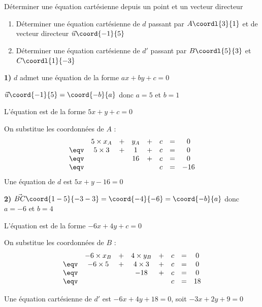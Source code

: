 \begin{methode}{Déterminer une équation cartésienne depuis un point et un vecteur directeur}
	\begin{enumerate}
		\item Déterminer une équation cartésienne de $d$ passant par $A\coordl{3}{1}$ et de vecteur directeur $\vec{u}\coord{-1}{5}$
		\item Déterminer une équation cartésienne de $d'$ passant par $B\coordl{5}{3}$ et $C\coordl{1}{-3}$
	\end{enumerate}

	\begin{correction}

		\textbf{1)} $d$ admet une équation de la forme $ax + by + c = 0$

		$\vec{u}\coord{-1}{5} = \coord{-b}{a}$ donc $a = 5$ et $b = 1$

		L'équation est de la forme $5x + y + c = 0$

		On substitue les coordonnées de $A$ :
		\[
			\begin{array}{rccccccc}
				     & 5 \times x_A & + & y_A & + & c & = & 0   \\
				\eqv & 5 \times 3   & + & 1   & + & c & = & 0   \\
				\eqv &              &   & 16  & + & c & = & 0   \\
				\eqv &              &   &     &   & c & = & -16
			\end{array}
		\]
		\ms
		Une équation de $d$ est $5x + y - 16 = 0$

		\ms

		\textbf{2)} $\vec{BC}\coord{1-5}{-3-3} = \coord{-4}{-6} = \coord{-b}{a}$ donc $a = -6$ et $b = 4$

		L'équation est de la forme $-6x + 4y + c = 0$

		On substitue les coordonnées de $B$ :
		\[
			\begin{array}{rccccccc}
				     & -6 \times x_B & + & 4 \times y_B & + & c & = & 0  \\
				\eqv & -6 \times 5   & + & 4 \times 3   & + & c & = & 0  \\
				\eqv &               &   & -18          & + & c & = & 0  \\
				\eqv &               &   &              &   & c & = & 18
			\end{array}
		\]

		Une équation cartésienne de $d'$ est $-6x + 4y + 18 = 0$, soit $-3x + 2y + 9 = 0$
	\end{correction}
\end{methode}

